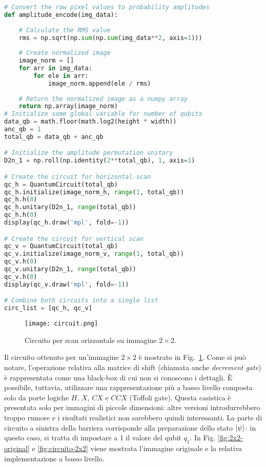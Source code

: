 \begin{lstlisting}[language=Python, 
    caption={Creazione dei circuiti per lo scan orizzontale e verticale.}, label=cod:circuit]
# Convert the raw pixel values to probability amplitudes
def amplitude_encode(img_data):
    
    # Calculate the RMS value
    rms = np.sqrt(np.sum(np.sum(img_data**2, axis=1)))
    
    # Create normalized image
    image_norm = []
    for arr in img_data:
        for ele in arr:
            image_norm.append(ele / rms)
        
    # Return the normalized image as a numpy array
    return np.array(image_norm)
# Initialize some global variable for number of qubits
data_qb = math.floor(math.log2(height * width))
anc_qb = 1
total_qb = data_qb + anc_qb

# Initialize the amplitude permutation unitary
D2n_1 = np.roll(np.identity(2**total_qb), 1, axis=1)

# Create the circuit for horizontal scan
qc_h = QuantumCircuit(total_qb)
qc_h.initialize(image_norm_h, range(1, total_qb))
qc_h.h(0)
qc_h.unitary(D2n_1, range(total_qb))
qc_h.h(0)
display(qc_h.draw('mpl', fold=-1))

# Create the circuit for vertical scan
qc_v = QuantumCircuit(total_qb)
qc_v.initialize(image_norm_v, range(1, total_qb))
qc_v.h(0)
qc_v.unitary(D2n_1, range(total_qb))
qc_v.h(0)
display(qc_v.draw('mpl', fold=-1))

# Combine both circuits into a single list
circ_list = [qc_h, qc_v]
\end{lstlisting} 

\begin{figure}[ht]
    \texttt{[image: circuit.png]}
    \caption{Circuito per scan orizzontale su immagine $2 \times 2$.}
    \label{fig:circuit}
\end{figure}

Il circuito ottenuto per un'immagine $2 \times 2$ è mostrato in Fig.~\ref{fig:circuit}.
Come si può notare, l'operazione relativa alla matrice di shift (chiamata anche
\emph{decrement gate}) è 
rappresentata come una black-box di cui non si conoscono i dettagli.
È possibile, tuttavia, utilizzare una rappresentazione più a basso livello 
composta solo da porte logiche $H$, $X$, $CX$ e $CCX$ (Toffoli gate).
Questa casistica è presentata solo per immagini di piccole dimensioni: altre versioni
introdurrebbero troppo rumore e i risultati realistici non sarebbero quindi 
interessanti. La parte di circuito a sinistra della barriera
corrisponde alla preparazione dello stato $\lvert\psi\rangle$: in questo caso, si tratta 
di impostare a 1 il valore del qubit $q_1$.
In Fig. \ref{fig:2x2-original} e \ref{fig:circuito-2x2} viene mostrata l'immagine 
originale e la relativa implementazione a basso livello.

